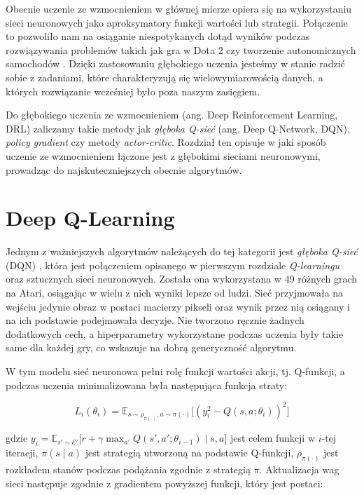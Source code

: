 \documentclass[licencjacka]{pracamgr}
\begin{document}
Obecnie uczenie ze wzmocnieniem w głównej mierze opiera się na wykorzystaniu sieci neuronowych jako aproksymatory funkcji wartości lub strategii. Połączenie to pozwoliło nam na osiąganie niespotykanych dotąd wyników podczas rozwiązywania problemów takich jak gra w Dota 2 \cite{dota2} czy tworzenie autonomicznych samochodów \cite{sdc1, sdc2}. Dzięki zastosowaniu głębokiego uczenia jesteśmy w stanie radzić sobie z zadaniami, które charakteryzują się wielowymiarowością danych, a których rozwiązanie wcześniej było poza naszym zasięgiem.

Do głębokiego uczenia ze wzmocnieniem (ang. Deep Reinforcement Learning, DRL) zaliczamy takie metody jak \emph{głęboka Q-sieć} (ang. Deep Q-Network, DQN),  \emph{policy gradient} czy metody \emph{actor-critic}. Rozdział ten opisuje w jaki sposób uczenie ze wzmocnieniem łączone jest z głębokimi sieciami neuronowymi, prowadząc do najskuteczniejszych obecnie algorytmów. 

\section{Deep Q-Learning}

Jednym z ważniejszych algorytmów należących do tej kategorii jest \emph{głęboka Q-sieć} (DQN) \cite{dqn}, która jest połączeniem opisanego w pierwszym rozdziale \emph{Q-learningu} \cite{Q-learning} oraz sztucznych sieci neuronowych. Została ona wykorzystana w 49 różnych grach na Atari, osiągając w wielu z nich wyniki lepsze od ludzi. Sieć przyjmowała na wejściu jedynie obraz w postaci macierzy pikseli oraz wynik przez nią osiągany i na ich podstawie podejmowała decyzje. Nie tworzono ręcznie żadnych dodatkowych cech, a hiperparametry wykorzystane podczas uczenia były takie same dla każdej gry, co wskazuje na dobrą generyczność algorytmu.

W tym modelu sieć neuronowa pełni rolę funkcji wartości akcji, tj. Q-funkcji, a podczas uczenia minimalizowana była następująca funkcja straty:

$$ L_i(\theta_i) = \mathbb{E}_{s \sim \rho_{\pi(\cdot)}, a \sim \pi(\cdot)} \Big[ (y_i^2 - Q(s, a; \theta_i))^2 \Big] $$

gdzie $ y_i = \mathbb{E}_{s' \sim \mathcal{E}'} \big[ r + \gamma \max_{a'} Q(s', a'; \theta_{i - 1}) \mid s, a \big] $ jest celem funkcji w $i$-tej iteracji, $\pi(s \mid a)$ jest strategią utworzoną na podstawie Q-funkcji, $\rho_{\pi(\cdot)} $ jest rozkładem stanów podczas podążania zgodnie z strategią $\pi$. Aktualizacja wag sieci następuje zgodnie z gradientem powyższej funkcji, który jest postaci:
\end{document}
